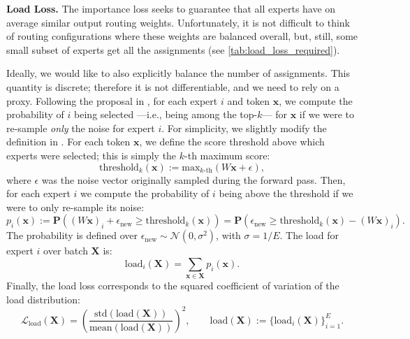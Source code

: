 \documentclass{article}
\begin{document}
\textbf{Load Loss.}
The importance loss seeks to guarantee that all experts have on average similar output routing weights.
Unfortunately, it is not difficult to think of routing configurations where these weights are balanced overall, but, still, some small subset of experts get all the assignments (see \cref{tab:load_loss_required}).

Ideally, we would like to also explicitly balance the number of assignments.
This quantity is discrete; therefore it is not differentiable, and we need to rely on a proxy.
Following the proposal in \cite{shazeer2017outrageously}, for each expert $i$ and token $\mathbf{x}$, we compute the probability of $i$ being selected ---i.e., being among the top-$k$--- for $\mathbf{x}$ if we were to re-sample \emph{only} the noise for expert $i$.
For simplicity, we slightly modify the definition in \cite{shazeer2017outrageously}.
For each token $\mathbf{x}$, we define the score threshold above which experts were selected; this is simply the $k$-th maximum score:
\begin{equation}
    \text{threshold}_k(\mathbf{x}) := \text{max}_{k\text{-th}} \left( W\mathbf{x} + \epsilon \right),
\end{equation}
where $\epsilon$ was the noise vector originally sampled during the forward pass.
Then, for each expert $i$ we compute the probability of $i$ being above the threshold if we were to only re-sample its noise:
\begin{equation}
    p_{i}(\mathbf{x}) := \mathbf{P}((W\mathbf{x})_i + \epsilon_{\text{new}} \ge \text{threshold}_k(\mathbf{x})) = \mathbf{P}( \epsilon_{\text{new}} \ge \text{threshold}_k(\mathbf{x}) - (W\mathbf{x})_i).
\end{equation}
The probability is defined over $\epsilon_{\text{new}} \sim \mathcal{N}(0, \sigma^2)$, with $\sigma = 1/E$.
The load for expert $i$ over batch $\mathbf{X}$ is:
\begin{equation}
    \text{load}_i(\mathbf{X}) = \sum_{\mathbf{x} \in \mathbf{X}} p_i(\mathbf{x}).
\end{equation}
Finally, the load loss corresponds to the squared coefficient of variation of the load distribution:
\begin{equation}\label{eq:load_loss}
    \mathcal{L}_{\text{load}}(\mathbf{X}) = \left( \frac{\text{std}(\text{load}(\mathbf{X}))}{\text{mean}(\text{load}(\mathbf{X}))} \right)^2,  \qquad \text{load}(\mathbf{X}) := \{ \text{load}_i(\mathbf{X}) \}_{i=1}^E.
\end{equation}
\end{document}
